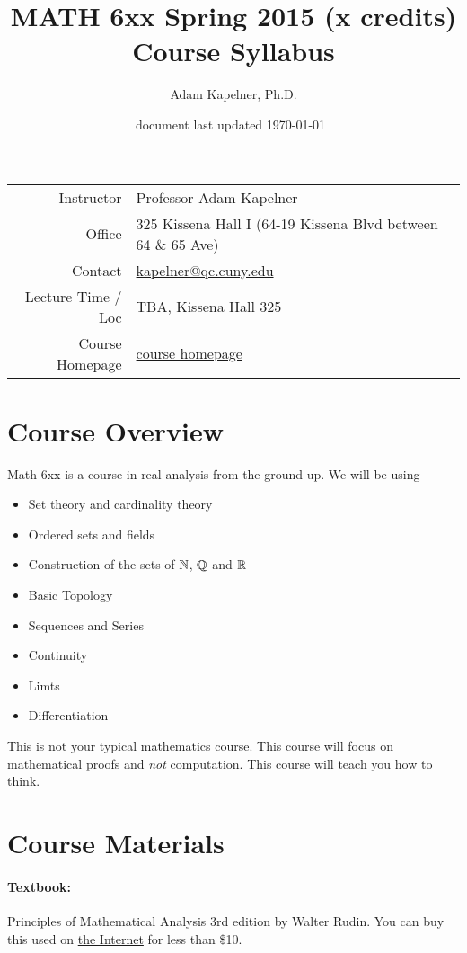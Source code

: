 \documentclass[12pt]{article}
\title{MATH 6xx Spring 2015 (x credits) \\ Course Syllabus}
\author[]{Adam Kapelner, Ph.D.}
\affil[]{Queens College, City University of New York}
\date{\small document last updated \today ~\currenttime }
\newcommand{\coursewebpage}{\href{https://github.com/kapelner/QC_Real_Analysis_Ind_Spring_2015}{course homepage}}
\begin{document}
\maketitle

\begin{table}[htp]
\centering
\begin{tabular}{rl}
Instructor & Professor Adam Kapelner \\
Office & 325 Kissena Hall I (64-19 Kissena Blvd between 64 \& 65 Ave) \\
Contact & \url{kapelner@qc.cuny.edu} \\
Lecture Time / Loc & TBA, Kissena Hall 325 \\
Course Homepage & \coursewebpage
\end{tabular}
\end{table}

\section*{Course Overview}

Math 6xx is a course in real analysis from the ground up. We will be using 

\begin{itemize}
\itemsep -0.0em 
\item Set theory and cardinality theory
\item Ordered sets and fields
\item Construction of the sets of $\mathbb{N}$, $\mathbb{Q}$ and $\mathbb{R}$
\item Basic Topology
\item Sequences and Series
\item Continuity
\item Limts
\item Differentiation
\end{itemize}

This is not your typical mathematics course. This course will focus on mathematical proofs and \textit{not} computation. This course will teach you how to think.


\section*{Course Materials}

\paragraph{Textbook:} Principles of Mathematical Analysis 3rd edition by Walter Rudin. You can buy this used on \href{http://www.abebooks.com/servlet/SearchResults?kn=rudin&tn=Principles+of+Mathematical+Analysis}{the Internet} for less than \$10.
\end{document}
